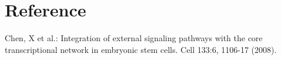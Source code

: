 %
%
%



\newpage
\section{Reference}
Chen, X et al.: Integration of external signaling pathways with the core transcriptional network in embryonic stem cells. Cell 133:6, 1106-17 (2008).
